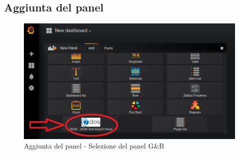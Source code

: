 \subsection{Aggiunta del panel}
\begin{figure} [H]
	\centering
	\includegraphics[scale=0.8]{Img/aggiuntapanel} 
	\caption{Aggiunta del panel - Selezione del panel G\&B} \label{} 
\end{figure} 